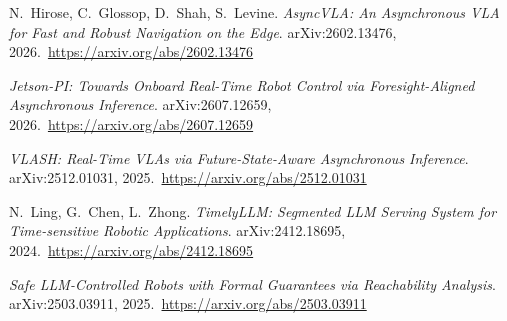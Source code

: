 \documentclass[11pt,a4paper]{article}
\begin{document}
\begingroup\sloppy
\begin{enumerate}[leftmargin=1.8em,itemsep=2pt,label={[\arabic*]}]
  \item N.~Hirose, C.~Glossop, D.~Shah, S.~Levine.
        \emph{AsyncVLA: An Asynchronous VLA for Fast and Robust Navigation on the Edge}.
        arXiv:2602.13476, 2026.\ \url{https://arxiv.org/abs/2602.13476}
  \item \emph{Jetson-PI: Towards Onboard Real-Time Robot Control via
        Foresight-Aligned Asynchronous Inference}.
        arXiv:2607.12659, 2026.\ \url{https://arxiv.org/abs/2607.12659}
  \item \emph{VLASH: Real-Time VLAs via Future-State-Aware Asynchronous Inference}.
        arXiv:2512.01031, 2025.\ \url{https://arxiv.org/abs/2512.01031}
  \item N.~Ling, G.~Chen, L.~Zhong.
        \emph{TimelyLLM: Segmented LLM Serving System for Time-sensitive
        Robotic Applications}.
        arXiv:2412.18695, 2024.\ \url{https://arxiv.org/abs/2412.18695}
  \item \emph{Safe LLM-Controlled Robots with Formal Guarantees via
        Reachability Analysis}.
        arXiv:2503.03911, 2025.\ \url{https://arxiv.org/abs/2503.03911}
\end{enumerate}
\endgroup
\end{document}
